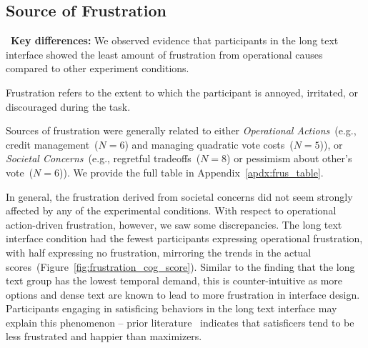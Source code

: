 
%




\subsection{Source of Frustration} 
\label{sec:frustration}

\begin{tldrbox}
   \faKey~\textbf{Key differences:} We observed evidence that participants in the long text interface showed the least amount of frustration from operational causes compared to other experiment conditions.%
\end{tldrbox}

Frustration refers to the extent to which the participant is annoyed, irritated, or discouraged during the task. 

Sources of frustration were generally related to either \textit{Operational Actions}~(e.g., credit management~($N=6$) and managing quadratic vote costs~($N=5$)), or \textit{Societal Concerns}~(e.g., regretful tradeoffs~($N=8$) or  pessimism about other's vote~($N=6$)). We provide the full table in Appendix~\ref{apdx:frus_table}.

In general, the frustration derived from societal concerns did not seem strongly affected by any of the experimental conditions. With respect to operational action-driven frustration, however, we saw some discrepancies. The long text interface condition had the fewest participants expressing operational frustration, with half expressing no frustration, mirroring the trends in the actual scores~(Figure~\ref{fig:frustration_cog_score}). Similar to the finding that the long text group has the lowest temporal demand, this is counter-intuitive as more options and dense text are known to lead to more frustration in interface design. Participants engaging in satisficing behaviors in the long text interface may explain this phenomenon -- prior literature~\cite{polmanWhyAreMaximizers2010, schwartzMaximizingSatisficingHappiness2002} indicates that satisficers tend to be less frustrated and happier than maximizers. 

